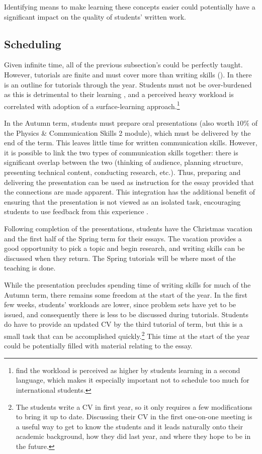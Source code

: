 Identifying means to make learning these concepts easier could potentially have a significant impact on the quality of students' written work.

\subsection{Scheduling}\label{sec:timetable}

Given infinite time, all of the previous subsection's could be perfectly taught. However, tutorials are finite and must cover more than writing skills (). In  there is an outline for tutorials through the year. Students must not be over-burdened as this is detrimental to their learning \citep[chapter 8]{Ramsden1992}, and a perceived heavy workload is correlated with adoption of a surface-learning approach\citep[and references therein]{Kember1998}.\footnote{\citet{Kember1998} find the workload is perceived as higher by students learning in a second language, which makes it especially important not to schedule too much for international students.}

In the Autumn term, students must prepare oral presentations (also worth $10\%$ of the Physics \& Communication Skills 2 module), which must be delivered by the end of the term. This leaves little time for written communication skills. However, it is possible to link the two types of communication skills together: there is significant overlap between the two (thinking of audience, planning structure, presenting technical content, conducting research, etc.). Thus, preparing and delivering the presentation can be used as instruction for the essay provided that the connections are made apparent. This integration has the additional benefit of ensuring that the presentation is not viewed as an isolated task, encouraging students to use feedback from this experience \citep{Housell2003}.

Following completion of the presentations, students have the Christmas vacation and the first half of the Spring term for their essays. The vacation provides a good opportunity to pick a topic and begin research, and writing skills can be discussed when they return. The Spring tutorials will be where most of the teaching is done.

While the presentation precludes spending time of writing skills for much of the Autumn term, there remains some freedom at the start of the year. In the first few weeks, students' workloads are lower, since problem sets have yet to be issued, and consequently there is less to be discussed during tutorials. Students do have to provide an updated CV by the third tutorial of term, but this is a small task that can be accomplished quickly.\footnote{The students write a CV in first year, so it only requires a few modifications to bring it up to date. Discussing their CV in the first one-on-one meeting is a useful way to get to know the students and it leads naturally onto their academic background, how they did last year, and where they hope to be in the future.} This time at the start of the year could be potentially filled with material relating to the essay.

